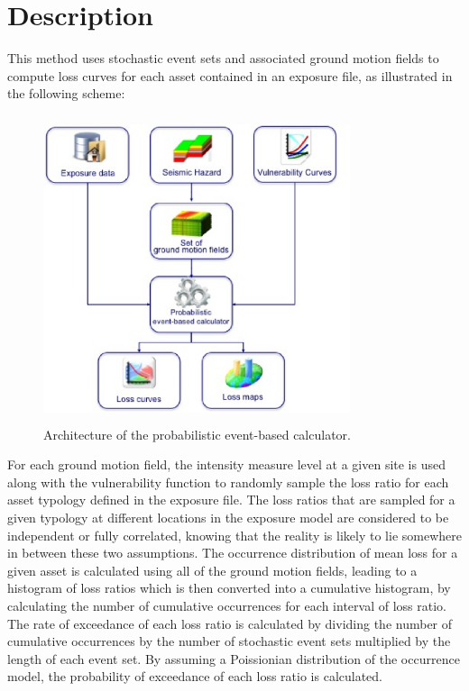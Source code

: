\section{Description}
This method uses stochastic event sets and associated ground motion fields to compute loss curves for each asset contained in an exposure file, as illustrated in the following scheme:  

\begin{figure}[ht]
\centering
\includegraphics[width=9cm,height=9cm]{./Figures/Part_Risk/Scheme_Prob_calc.eps}
\caption{Architecture of the probabilistic event-based calculator.}
\label{fig:Scheme_Prob_calc}
\end{figure}

For each ground motion field, the intensity measure level at a given site is used along with the vulnerability function to randomly sample the loss ratio for each asset typology defined in the exposure file. The loss ratios that are sampled for a given typology at different locations in the exposure model are considered to be independent or fully correlated, knowing that the reality is likely to lie somewhere in between these two assumptions. The occurrence distribution of mean loss for a given asset is calculated using all of the ground motion fields, leading to a histogram of loss ratios which is then converted into a cumulative histogram, by calculating the number of cumulative occurrences for each interval of loss ratio. The rate of exceedance of each loss ratio is calculated by dividing the number of cumulative occurrences by the number of stochastic event sets multiplied by the length of each event set. By assuming a Poissionian distribution of the occurrence model, the probability of exceedance of each loss ratio is calculated. 
 
